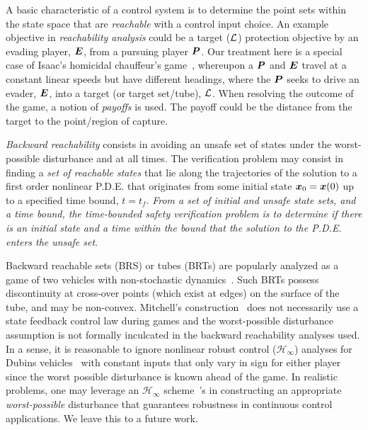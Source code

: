 \noindent A basic characteristic of a control system is to determine the  point sets within the state space that are \textit{reachable} with a control input choice. An example objective in \textit{reachability analysis} could be a target ($\mathcal{L}$) protection objective by an evading player, $\bm{E}$, from a pursuing player $\bm{P}$. Our treatment here is a special case of Isaac's homicidal chauffeur's game~\cite{Isaacs1965}, whereupon a $\bm{P}$ and $\bm{E}$ travel at a constant linear speeds but have different headings, \eg where the $\bm{P}$ seeks to drive an evader, $\bm{E}$, into a target (or target set/tube), $\mathcal{L}$. When resolving the 
outcome of the game, a notion of \textit{payoffs} is used. The payoff could be the distance from the target to the point/region of capture. 

\textit{Backward reachability} consists in avoiding an unsafe set of states under the worst-possible disturbance and at all times. The verification problem may consist in finding a \textit{set of reachable states} that lie along the trajectories of the solution to a first order nonlinear P.D.E. that originates from some initial state $\bm{x}_0 = \bm{x}(0)$ up to a specified time bound, $t=t_f$. \textit{From a set of initial and unsafe state sets, and a time bound, the time-bounded safety verification problem is to determine if there is an initial state and a time within the bound that the solution to the P.D.E. enters the unsafe set}.
 
Backward reachable sets (BRS) or tubes (BRTs) are popularly analyzed as a game of two vehicles with non-stochastic dynamics~\cite{Merz1972}. Such BRTs possess discontinuity at cross-over points (which exist at edges) on the surface of the  tube, and may be non-convex. Mitchell's construction~\cite{Mitchell2005} does not necessarily use a state feedback control law during games and the worst-possible disturbance assumption is not formally inculcated in the backward reachability analyses used. In a sense, it is reasonable to ignore nonlinear robust control (\eg $\mathcal{H}_\infty$) analyses for Dubins vehicles~\cite{Dubins1957} with constant inputs that only vary in sign for either player \cite{Merz1972} since the worst possible disturbance is known ahead of the game. In realistic problems, one may  leverage an $\mathcal{H}_\infty$ scheme~\cite{DoyleBook}'s  in constructing an appropriate \textit{worst-possible} disturbance that  guarantees robustness in continuous control applications. We leave this to a future work. %

